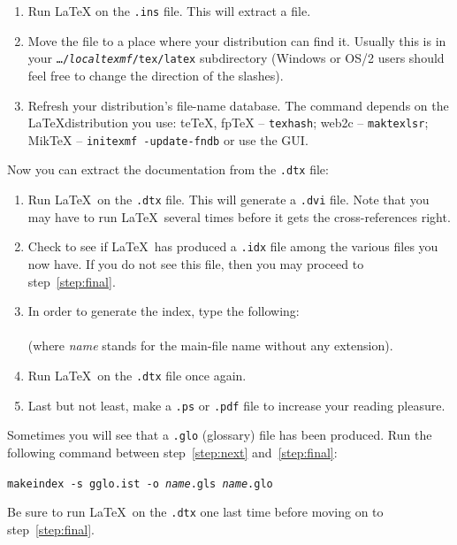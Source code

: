 \begin{enumerate}
\item Run \LaTeX{} on the \texttt{.ins} file. This will
  extract a  file.
\item Move the  file to a place where your distribution
  can find it. Usually this is in your \texttt{\ldots/\emph{localtexmf}/tex/latex}
  subdirectory (Windows or OS/2 users should feel free to change the
  direction of the slashes).
\item Refresh your distribution's file-name database. The command
  depends on the \LaTeX distribution you use:
  teTeX, fpTeX -- \texttt{texhash}; web2c -- \texttt{maktexlsr};
  MikTeX -- \texttt{initexmf -update-fndb} or use the GUI.
\end{enumerate}

\noindent Now you can extract the documentation from the
\texttt{.dtx} file:

\begin{enumerate}
\item Run \LaTeX\ on the \texttt{.dtx} file.  This will generate a
  \texttt{.dvi} file. Note that you may have to run \LaTeX\
  several times before it gets the cross-references right.
\item Check to see if \LaTeX\ has produced a \texttt{.idx} file
  among the various files you now have.
  If you do not see this file, then you may proceed to
  step~\ref{step:final}.
\item In order to generate the index, type the following:\\
        \\
        (where \textit{name} stands for the main-file name without any
    extension).
 \item Run \LaTeX\ on the \texttt{.dtx} file once again. \label{step:next}
    
\item Last but not least, make a \texttt{.ps} or \texttt{.pdf}
  file to increase your reading pleasure.\label{step:final}
  
\end{enumerate}

Sometimes you will see that a \texttt{.glo}
(glossary) file has been produced. Run the following
command between
step~\ref{step:next} and~\ref{step:final}:

\noindent\texttt{makeindex -s gglo.ist -o \textit{name}.gls \textit{name}.glo}

\noindent Be sure to run \LaTeX\ on the \texttt{.dtx} one last
time before moving on to step~\ref{step:final}.


